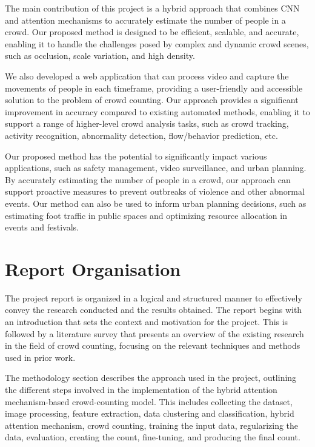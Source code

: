 \documentclass[12pt]{report}
\begin{document}
The main contribution of this project is a hybrid approach that combines CNN and attention mechanisms to accurately estimate the number of people in a crowd. Our proposed method is designed to be efficient, scalable, and accurate, enabling it to handle the challenges posed by complex and dynamic crowd scenes, such as occlusion, scale variation, and high density.
\newline

We also developed a web application that can process video and capture the movements of people in each timeframe, providing a user-friendly and accessible solution to the problem of crowd counting. Our approach provides a significant improvement in accuracy compared to existing automated methods, enabling it to support a range of higher-level crowd analysis tasks, such as crowd tracking, activity recognition, abnormality detection, flow/behavior prediction, etc.
\newline

Our proposed method has the potential to significantly impact various applications, such as safety management, video surveillance, and urban planning. By accurately estimating the number of people in a crowd, our approach can support proactive measures to prevent outbreaks of violence and other abnormal events. Our method can also be used to inform urban planning decisions, such as estimating foot traffic in public spaces and optimizing resource allocation in events and festivals.
\newline


\section{Report Organisation}

The project report is organized in a logical and structured manner to effectively convey the research conducted and the results obtained. The report begins with an introduction that sets the context and motivation for the project. This is followed by a literature survey that presents an overview of the existing research in the field of crowd counting, focusing on the relevant techniques and methods used in prior work.
\newline

The methodology section describes the approach used in the project, outlining the different steps involved in the implementation of the hybrid attention mechanism-based crowd-counting model. This includes collecting the dataset, image processing, feature extraction, data clustering and classification, hybrid attention mechanism, crowd counting, training the input data, regularizing the data, evaluation, creating the count, fine-tuning, and producing the final count.
\newline
\end{document}
